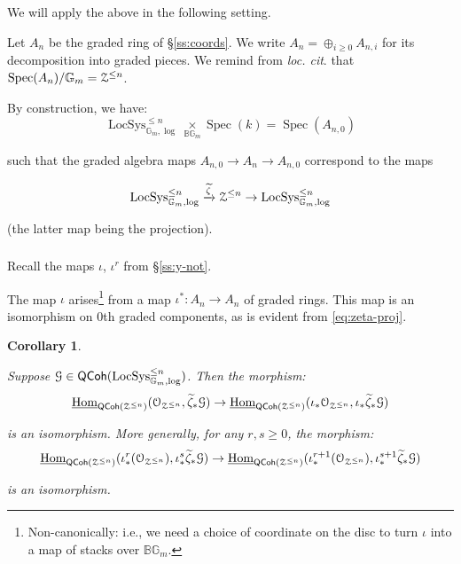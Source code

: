 \documentclass[reqno,11pt]{amsart}
\numberwithin{equation}{subsection}
\newtheorem{cor}[thm]{Corollary}
\theoremstyle{remark}
\newcommand{\xar}[1]{\xrightarrow{#1}}
\newcommand{\bB}{{\mathbb B}}
\newcommand{\bG}{{\mathbb G}}
\newcommand{\sG}{{\EuScript G}}
\newcommand{\sO}{{\EuScript O}}
\newcommand{\sZ}{{\EuScript Z}}
\newcommand{\on}{\operatorname}
\newcommand{\ul}{\underline}
\newcommand{\Hom}{\on{Hom}}
\newcommand{\Spec}{\on{Spec}}
\newcommand{\LocSys}{\on{LocSys}}
\newcommand{\QCoh}{\mathsf{QCoh}}
\begin{document}
\subsubsection{}

We will apply the above in the following setting.

Let $A_n$ be the graded ring of \S \ref{ss:coords}.
We write $A_n = \oplus_{i \geq 0} A_{n,i}$ for 
its decomposition into graded pieces. We remind
from \emph{loc. cit}. that $\Spec(A_n)/\bG_m = \sZ^{\leq n}$.

By construction, we have:
%
\[
\LocSys_{\bG_m,\log}^{\leq n} \underset{\bB \bG_m}{\times} \Spec(k) = \Spec(A_{n,0})
\]

\noindent such that the graded algebra maps $A_{n,0} \to A_n \to A_{n,0}$
correspond to the maps

\begin{equation}\label{eq:zeta-proj}
\LocSys_{\bG_m,\log}^{\leq n} \xar{\widetilde{\zeta}} \sZ^{\leq n} \to 
\LocSys_{\bG_m,\log}^{\leq n}
\end{equation}

\noindent (the latter map being the projection).

\subsubsection{}\label{sss:gr-hom}

Recall the maps $\iota$, $\iota^r$ from \S \ref{ss:y-not}.

The map $\iota$ arises\footnote{Non-canonically: i.e., we need a choice
of coordinate on the disc to turn $\iota$ into a map of 
stacks over $\bB \bG_m$.} from a map $\iota^*:A_n \to A_n$ of graded rings.
This map is an isomorphism
on $0$th graded components, as is evident from 
\eqref{eq:zeta-proj}. 

\begin{cor}\label{c:gr-hom}

Suppose $\sG \in \QCoh(\LocSys_{\bG_m,\log}^{\leq n})$. Then the morphism:
%
\[
\ul{\Hom}_{\QCoh(\sZ^{\leq n})}(\sO_{\sZ^{\leq n}},\widetilde{\zeta}_* \sG) \to 
\ul{\Hom}_{\QCoh(\sZ^{\leq n})}(\iota_*\sO_{\sZ^{\leq n}},\iota_*\widetilde{\zeta}_* \sG) 
\]

\noindent is an isomorphism. More generally, 
for any $r,s \geq 0$, the morphism:
%
\[
\ul{\Hom}_{\QCoh(\sZ^{\leq n})}(\iota_*^r(\sO_{\sZ^{\leq n}}),\iota_*^s\widetilde{\zeta}_* \sG) \to 
\ul{\Hom}_{\QCoh(\sZ^{\leq n})}(\iota_*^{r+1}(\sO_{\sZ^{\leq n}}),\iota_*^{s+1}\widetilde{\zeta}_* \sG) 
\]

\noindent is an isomorphism.
	
\end{cor}
\end{document}
